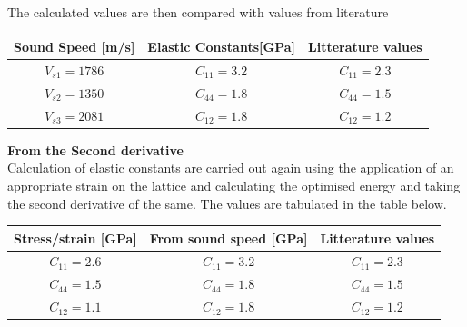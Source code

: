 \documentclass[a4paper]{article}
\begin{document}
The calculated values are then compared with values from literature 
\begin{center}
    \begin{tabular}{ |c|c|c| } 
    \hline
      Sound Speed [m/s] & Elastic Constants[GPa]  & Litterature values \\ 
     \hline
     $V_{s1} = 1786$ & $C_{11} = 3.2$  &$C_{11} = 2.3$ \\ 
     $V_{s2} = 1350$& $C_{44} = 1.8$ & $C_{44} = 1.5$ \\ 
     $V_{s3} = 2081$& $C_{12} = 1.8$ & $C_{12} = 1.2$ \\ 
     \hline
    \end{tabular}
\end{center}
\textbf{From the Second derivative}\\
Calculation of elastic constants are carried out again using the application of an appropriate strain on the lattice and calculating the optimised energy and taking the second derivative of the same. The values are tabulated in the table below.

\begin{center}
    \begin{tabular}{ |c|c|c| } 
    \hline
    Stress/strain [GPa] & From sound speed [GPa]  & Litterature values \\ 
     \hline
     $C_{11} = 2.6$ & $C_{11} = 3.2$  &$C_{11} = 2.3$ \\ 
     $C_{44} = 1.5$& $C_{44} = 1.8$ & $C_{44} = 1.5$ \\ 
     $C_{12} = 1.1$& $C_{12} = 1.8$ & $C_{12} = 1.2$ \\
     \hline 
    \end{tabular}
\end{center}
\end{document}

